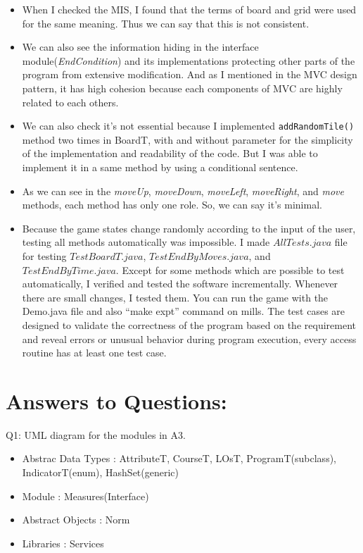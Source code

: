 \documentclass[12pt]{article}
\begin{document}
\begin{itemize}
  \item When I checked the MIS, I found that the terms of board and grid were used for the same meaning. Thus we can say that this is not consistent.
  \item We can also see the information hiding in the interface module(\textit{EndCondition}) and its implementations protecting other parts of the program from extensive modification. And as I mentioned in the MVC design pattern, it has high cohesion because each components of MVC are highly related to each others.
  \item We can also check it's not essential because I implemented \verb|addRandomTile()| method two times in BoardT, with and without parameter for the simplicity of the implementation and readability of the code. But I was able to implement it in a same method by using a conditional sentence.
  \item As we can see in the \textit{moveUp}, \textit{moveDown}, \textit{moveLeft}, \textit{moveRight}, and \textit{move} methods, each method has only one role. So, we can say it's minimal.
  \item Because the game states change randomly according to the input of the user, testing all methods automatically was impossible. I made $AllTests.java$ file for testing $TestBoardT.java$, $TestEndByMoves.java$, and $TestEndByTime.java$. Except for some methods which are possible to test automatically, I verified and tested the software incrementally. Whenever there are small changes, I tested them. You can run the game with the Demo.java file and also ``make expt'' command on mills. The test cases are designed to validate the correctness of the program based on the requirement and reveal errors or unusual behavior during program execution, every access routine has at least one test case. 
\end{itemize}

\newpage

\section*{Answers to Questions:}

Q1: UML diagram for the modules in A3.\\
\begin{itemize}
  \item Abstrac Data Types : AttributeT, CourseT, LOsT, ProgramT(subclass), IndicatorT(enum), HashSet(generic)
  \item Module : Measures(Interface)
  \item Abstract Objects : Norm
  \item Libraries : Services
\end{itemize}
\end{document}
